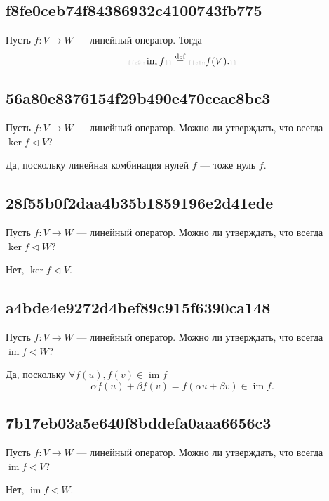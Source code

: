 \documentclass[11pt, a5paper]{article}
\newenvironment{note}[1]{\goodbreak\par\subsection{\hfill \color{lightgray}\tiny #1}}{}
\newenvironment{cloze}[2][\ldots]{\begin{leftbar}}{\end{leftbar}}
\newenvironment{icloze}[2][\ldots]{%
  \ignorespaces\text{\tiny \color{lightgray} \{\{c#2::}\hspace{0pt}%
}{%
  \hspace{0pt}\text{\tiny \color{lightgray}\}\}}\unskip%
}
\begin{document}
\begin{note}{f8fe0ceb74f84386932c4100743fb775}
    Пусть \( f : V \to W \) --- линейный оператор. Тогда
    \[
        \begin{icloze}{2}\operatorname{im} f\end{icloze} \overset{\text{def}}= \begin{icloze}{1}f(V).\end{icloze}
    \]
\end{note}

\begin{note}{56a80e8376154f29b490e470ceac8bc3}
    Пусть \( f : V \to W \) --- линейный оператор. Можно ли утверждать, что всегда \( \ker f \triangleleft V \)?

    \begin{cloze}{1}
        Да, поскольку линейная комбинация нулей \( f \) --- тоже нуль \( f \).
    \end{cloze}
\end{note}

\begin{note}{28f55b0f2daa4b35b1859196e2d41ede}
    Пусть \( f : V \to W \) --- линейный оператор. Можно ли утверждать, что всегда \( \ker f \triangleleft W \)?

    \begin{cloze}{1}
        Нет, \( \ker f \triangleleft V \).
    \end{cloze}
\end{note}

\begin{note}{a4bde4e9272d4bef89c915f6390ca148}
    Пусть \( f : V \to W \) --- линейный оператор. Можно ли утверждать, что всегда \( \operatorname{im} f \triangleleft W \)?

    \begin{cloze}{1}
        Да, поскольку \( \forall f(u), f(v) \in \operatorname{im} f \)
        \[
            \alpha f(u) + \beta f(v) = f(\alpha u + \beta v) \in \operatorname{im} f.
        \]
    \end{cloze}
\end{note}

\begin{note}{7b17eb03a5e640f8bddefa0aaa6656c3}
    Пусть \( f : V \to W \) --- линейный оператор. Можно ли утверждать, что всегда \( \operatorname{im} f \triangleleft V \)?

    \begin{cloze}{1}
        Нет, \( \operatorname{im} f \triangleleft W \).
    \end{cloze}
\end{note}
\end{document}
